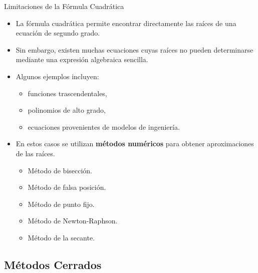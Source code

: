\documentclass[../../main.tex]{subfiles}
\begin{document}
\begin{frame}{Limitaciones de la Fórmula Cuadrática}
\begin{itemize}

    \item La fórmula cuadrática permite encontrar directamente las raíces de una ecuación de segundo grado.

    \item Sin embargo, existen muchas ecuaciones cuyas raíces no pueden determinarse mediante una expresión algebraica sencilla.

    \item Algunos ejemplos incluyen:
    \begin{itemize}
        \item funciones trascendentales,
        \item polinomios de alto grado,
        \item ecuaciones provenientes de modelos de ingeniería.
    \end{itemize}
    \item En estos casos se utilizan \textbf{métodos numéricos} para obtener aproximaciones de las raíces.

    \begin{itemize}
        \item Método de bisección.
        \item Método de falsa posición.
        \item Método de punto fijo.
        \item Método de Newton-Raphson.
        \item Método de la secante.
    \end{itemize}

\end{itemize}

\end{frame}



\subsection{Métodos Cerrados}
\end{document}

